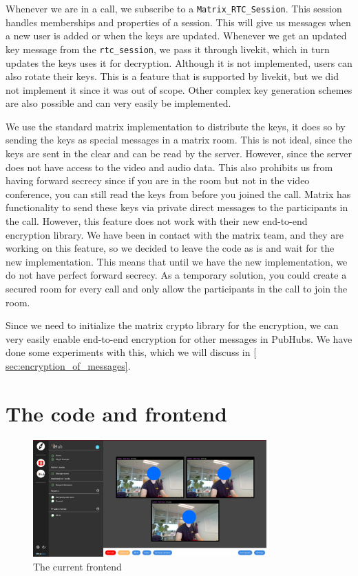 \documentclass{report}
\begin{document}
Whenever we are in a call, we subscribe to a \lstinline[language=js]{Matrix_RTC_Session}. This session handles
memberships and properties of a session. This will give us messages when a new user is added or when the keys are
updated. Whenever we get an updated key message from the \lstinline[language=js]{rtc_session}, we pass it through
livekit, which in turn updates the keys uses it for decryption. Although it is not implemented, users can also rotate
their keys. This is a feature that is supported by livekit, but we did not implement it since it was out of scope.
Other complex key generation schemes are also possible and can very easily be implemented.

We use the standard matrix implementation to distribute the keys, it does so by sending the keys as special
messages in a matrix room. This is not ideal, since the keys are sent in the clear and can be read by the server.
However, since the server does not have access to the video and audio data. This also prohibits us from having
forward secrecy since if you are in the room but not in the video conference, you can still read the keys from
before you joined the call. Matrix has functionality to send these keys via private direct messages to the
participants in the call. However, this feature does not work with their new end-to-end encryption library. We have
been in contact with the matrix team, and they are working on this feature, so we decided to leave the code as is
and wait for the new implementation. This means that until we have the new implementation, we do not have perfect
forward secrecy. As a temporary solution, you could create a secured room for every call and only allow the
participants in the call to join the room.

Since we need to initialize the matrix crypto library for the encryption, we can very easily enable end-to-end
encryption for other messages in PubHubs. We have done some experiments with this, which we will discuss in \autoref{
sec:encryption_of_messages}.

\section{The code and frontend}
\begin{figure}[!hbt]
\centering
\includegraphics[width=0.8\textwidth]{img/frontend.png}
\caption{The current frontend}
\label{fig:front-end-setup}
\end{figure}
\end{document}
